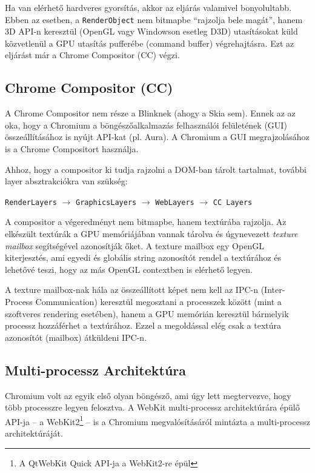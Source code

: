 \documentclass[12pt]{report}
\begin{document}
Ha van elérhető hardveres gyorsítás, akkor az eljárás valamivel bonyolultabb. Ebben az
esetben, a \texttt{RenderObject} nem bitmapbe ``rajzolja bele magát'', hanem 3D API-n
keresztül (OpenGL vagy Windowson esetleg D3D) utasításokat küld közvetlenül a GPU
utasítás pufferébe (command buffer) végrehajtásra. Ezt az eljárást már a
Chrome Compositor (CC) végzi.
\cite{bib:chromium-gpu, bib:chromium-oopifs}

\subsection{Chrome Compositor (CC)}
A Chrome Compositor nem része a Blinknek (ahogy a Skia sem). Ennek az az oka,
hogy a Chromium a böngészőalkalmazás felhasználói felületének (GUI) összeállításához is
nyújt API-kat (pl. Aura). A Chromium a GUI megrajzolásához is a Chrome Compositort
használja.

Ahhoz, hogy a compositor ki tudja rajzolni a DOM-ban tárolt tartalmat, további layer
absztrakciókra van szükség:
\begin{center}
    \texttt{RenderLayers} $\rightarrow$ \texttt{GraphicsLayers} $\rightarrow$
    \texttt{WebLayers} $\rightarrow$ \texttt{CC Layers}
\end{center}
A compositor a végeredményt nem bitmapbe, hanem textúrába rajzolja. Az elkészült
textúrák a GPU memóriájában vannak tárolva és úgynevezett \textit{texture mailbox}
segítségével azonosítják őket.
A texture mailbox egy OpenGL kiterjesztés, ami egyedi és globális
string azonosítót rendel a textúrához és lehetővé teszi, hogy az más OpenGL contextben
is elérhető legyen.
\cite{bib:chromium-gpu, bib:chromium-oopifs}

A texture mailbox-nak hála az összeállított képet nem kell az IPC-n (Inter-Process
Communication) keresztül megosztani a processzek között (mint a szoftveres rendering
esetében), hanem a GPU memórián keresztül bármelyik processz hozzáférhet a textúrához.
Ezzel a megoldással elég csak a textúra azonosítót (mailbox) átküldeni IPC-n.
\cite{bib:chromium-texture-mailbox}

\subsection{Multi-processz Architektúra}
Chromium volt az egyik első olyan böngésző, ami úgy lett megtervezve, hogy több processzre
legyen felosztva. A WebKit multi-processz architektúrára épülő API-ja
-- a WebKit2\footnote{A QtWebKit Quick API-ja a WebKit2-re épül} --
is a Chromium megvalósításáról mintázta a multi-processz architektúráját.
\cite{bib:webkit-webkit2}
\end{document}
